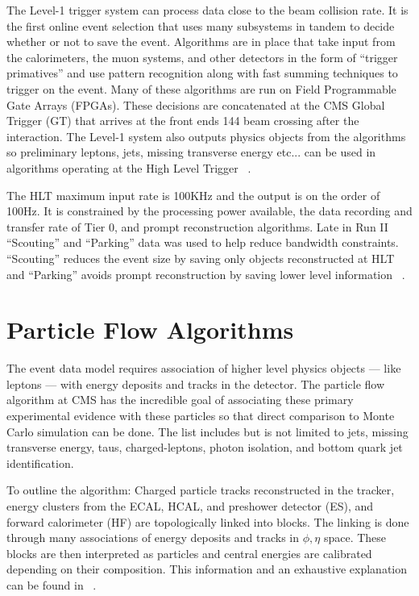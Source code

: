 The Level-1 trigger system can process data close to the beam collision rate. It is the first online event selection that uses many subsystems in tandem to decide whether or not to save the event. Algorithms are in place that take input from the calorimeters, the muon systems, and other detectors in the form of ``trigger primatives'' and use pattern recognition along with fast summing techniques to trigger on the event. Many of these algorithms are run on Field Programmable Gate Arrays (FPGAs). These decisions are concatenated at the CMS Global Trigger (GT) that arrives at the front ends 144 beam crossing after the interaction. The Level-1 system also outputs physics objects from the algorithms so preliminary leptons, jets, missing transverse energy etc... can be used in algorithms operating at the High Level Trigger ~\cite{Foudas:2232067}. 


The HLT maximum input rate is 100KHz and the output is on the order of 100Hz. It is constrained by the processing power available, the data recording and transfer rate of Tier 0, and prompt reconstruction algorithms. Late in Run II  ``Scouting'' and ``Parking'' data was used to help reduce bandwidth constraints. ``Scouting'' reduces the event size by saving only objects reconstructed at HLT and ``Parking'' avoids prompt reconstruction by saving lower level information ~\cite{Thomas:2703017}.


\section{Particle Flow Algorithms}
The event data model requires association of higher level physics objects --- like leptons --- with energy deposits and tracks in the detector. The particle flow algorithm at CMS has the incredible goal of associating these primary experimental evidence with these particles so that direct comparison to Monte Carlo simulation can be done. The list includes but is not limited to jets, missing transverse energy, taus, charged-leptons, photon isolation, and bottom quark jet identification.

To outline the algorithm: Charged particle tracks reconstructed in the tracker, energy clusters from the ECAL, HCAL, and preshower detector (ES), and forward calorimeter (HF) are topologically linked into blocks. The linking is done through many associations of energy deposits and tracks in $\phi,\eta$ space. These blocks are then interpreted as particles and central energies are calibrated depending on their composition. This information and an exhaustive explanation can be found in ~\cite{CMS-PAS-PFT-10-001}.

